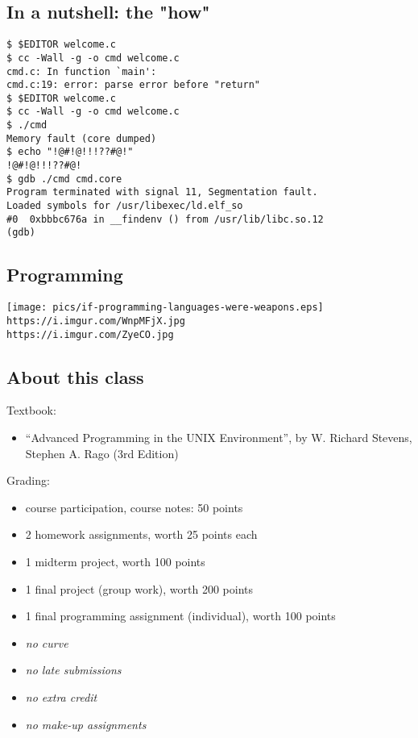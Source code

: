 \documentclass[sxga]{xdvislides}
\begin{document}
\subsection{In a nutshell: the "how"}
\begin{verbatim}
$ $EDITOR welcome.c
$ cc -Wall -g -o cmd welcome.c
cmd.c: In function `main':
cmd.c:19: error: parse error before "return"
$ $EDITOR welcome.c
$ cc -Wall -g -o cmd welcome.c
$ ./cmd
Memory fault (core dumped)
$ echo "!@#!@!!!??#@!"
!@#!@!!!??#@!
$ gdb ./cmd cmd.core
Program terminated with signal 11, Segmentation fault.
Loaded symbols for /usr/libexec/ld.elf_so
#0  0xbbbc676a in __findenv () from /usr/lib/libc.so.12
(gdb)
\end{verbatim}

\subsection{Programming}
\begin{center}
\texttt{[image: pics/if-programming-languages-were-weapons.eps]} \\
\vspace{.5in}
\verb+https://i.imgur.com/WnpMFjX.jpg+ \\
\verb+https://i.imgur.com/ZyeCO.jpg+
\end{center}

\subsection{About this class}
Textbook:
\begin{itemize}
	\item ``Advanced Programming in the UNIX Environment'', by
		W. Richard Stevens, Stephen A. Rago (3rd Edition)
\end{itemize}
\addvspace{.25in}

Grading:
\begin{itemize}
	\item course participation, course notes: 50 points
	\item 2 homework assignments, worth 25 points each
	\item 1 midterm project, worth 100 points
	\item 1 final project (group work), worth 200 points
	\item 1 final programming assignment (individual), worth 100 points
	\item {\em no curve}
	\item {\em no late submissions}
	\item {\em no extra credit}
	\item {\em no make-up assignments}
\end{itemize}
\end{document}
